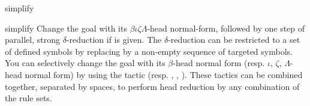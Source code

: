 \begin{tactic}{simplify}
  \begin{tsyntax}[empty]{simplify}
  Change the goal with its $\beta\iota\zeta\Lambda$-head normal-form, followed
  by one step of parallel, strong $\delta$-reduction if  is given.
  The $\delta$-reduction can be restricted to a set of defined symbols by
  replacing  by a non-empty sequence of targeted symbols. You can
  selectively change the goal with its $\beta$-head normal form
  (resp. $\iota$, $\zeta$, $\Lambda$-head normal form) by using the tactic
   (resp. , , ). These tactics can be
  combined together, separated by spaces, to perform head reduction by any
  combination of the rule sets.
  \end{tsyntax}
\end{tactic}
